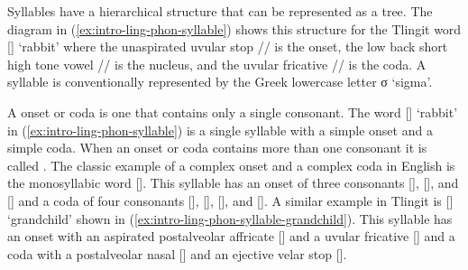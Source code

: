 Syllables have a hierarchical structure that can be represented as a tree. The diagram in (\ref{ex:intro-ling-phon-syllable}) shows this structure for the Tlingit word  [] ‘rabbit’ where the unaspirated uvular stop // is the onset, the low back short high tone vowel // is the nucleus, and the uvular fricative // is the coda. A syllable is conventionally represented by the Greek lowercase letter σ ‘sigma’.

\ex\label{ex:intro-ling-phon-syllable}%
%
\xe

A  onset or coda is one that contains only a single consonant. The word  [] ‘rabbit’ in (\ref{ex:intro-ling-phon-syllable}) is a single syllable with a simple onset and a simple coda. When an onset or coda contains more than one consonant it is called . The classic example of a complex onset and a complex coda in English is the monosyllabic word  []. This syllable has an onset of three consonants [], [], and [] and a coda of four consonants [], [], [], and []. A similar example in Tlingit is  [] ‘grandchild’ shown in (\ref{ex:intro-ling-phon-syllable-grandchild}). This syllable  has an onset with an aspirated postalveolar affricate [] and a uvular fricative [] and a coda with a postalveolar nasal [] and an ejective velar stop [].

